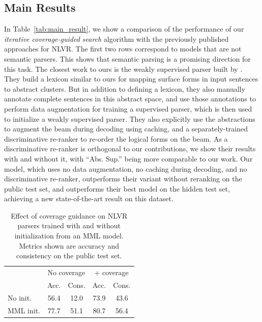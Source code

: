 \subsection{Main Results}
In Table~\ref{tab:main_result}, we show a comparison of the performance of our \textit{iterative coverage-guided search} algorithm with the previously published approaches for NLVR. The first two rows correspond to models that are not semantic parsers. This shows that semantic parsing is a promising direction for this task. The closest work to ours is the weakly supervised parser built by \cite{goldman2017weakly}. They build a lexicon similar to ours for mapping surface forms in input sentences to abstract clusters. But in addition to defining a lexicon, they also manually annotate complete sentences in this abstract space, and use those annotations to perform data augmentation for training a supervised parser, which is then used to initialize a weakly supervised parser. They also explicitly use the abstractions to augment the beam during decoding using caching, and a separately-trained discriminative re-ranker to re-order the logical forms on the beam.  As a discriminative re-ranker is orthogonal to our contributions, we show their results with and without it, with ``Abs. Sup.'' being more comparable to our work. Our model, which uses no data augmentation, no caching during decoding, and no discriminative re-ranker, outperforms their variant without reranking on the public test set, and outperforms their best model on the hidden test set, achieving a new state-of-the-art result on this dataset.

\begin{table}
	\centering
	\begin{tabular}{lcccc}
	\toprule
	\multicolumn{1}{c}{}& \multicolumn{2}{c}{No coverage} & \multicolumn{2}{c}{+ coverage} \\
	\multicolumn{1}{c}{}& Acc. & Cons. & Acc. & Cons. \\
	\midrule
	No init.  & 56.4 & 12.0 & 73.9 & 43.6 \\
	MML init. & 77.7 & 51.1 & 80.7 & 56.4 \\
	\bottomrule
	\end{tabular}
	\caption{Effect of coverage guidance on NLVR parsers trained with and without initialization from an MML model. Metrics shown are accuracy and consistency on the public test set.}\label{tab:coverage_guidance}
\end{table}

